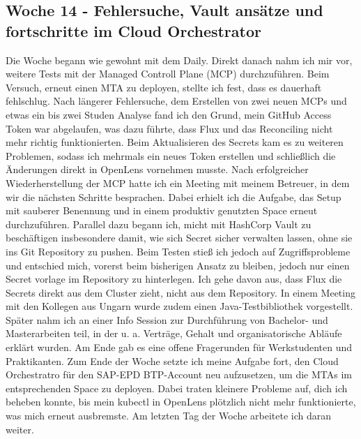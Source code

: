 \subsection{Woche 14 - Fehlersuche, Vault ansätze und fortschritte im Cloud Orchestrator}
Die Woche begann wie gewohnt mit dem Daily.
Direkt danach nahm ich mir vor, weitere Tests mit der Managed Controll Plane (MCP) durchzuführen.
Beim Versuch, erneut einen MTA zu deployen, stellte ich fest, dass es dauerhaft fehlschlug.
Nach längerer Fehlersuche, dem Erstellen von zwei neuen MCPs und etwas ein bis zwei Studen Analyse fand ich den Grund, mein
GitHub Access Token war abgelaufen, was dazu führte, dass Flux und das Reconciling nicht mehr richtig funktionierten.
Beim Aktualisieren des Secrets kam es zu weiteren Problemen, sodass ich mehrmals ein neues Token erstellen und schließlich die
Änderungen direkt in OpenLens vornehmen musste.
Nach erfolgreicher Wiederherstellung der MCP hatte ich ein Meeting mit meinem Betreuer, in dem wir die nächsten Schritte
besprachen.
Dabei erhielt ich die Aufgabe, das Setup mit sauberer Benennung und in einem produktiv genutzten Space erneut durchzuführen.
Parallel dazu begann ich, micht mit HashCorp Vault zu beschäftigen insbesondere damit, wie sich Secret sicher verwalten lassen,
ohne sie ins Git Repository zu pushen.
Beim Testen stieß ich jedoch auf Zugriffsprobleme und entschied mich, vorerst beim bisherigen Ansatz zu bleiben, jedoch
nur einen Secret vorlage im Repository zu hinterlegen.
Ich gehe davon aus, dass Flux die Secrets direkt aus dem Cluster zieht, nicht aus dem Repository.
In einem Meeting mit den Kollegen aus Ungarn wurde zudem einen Java-Testbibliothek vorgestellt.
Später nahm ich an einer Info Session zur Durchführung von Bachelor- und Masterarbeiten teil, in der u. a. Verträge, Gehalt
und organisatorische Abläufe erklärt wurden.
Am Ende gab es eine offene Fragerunden für Werkstudenten und Praktikanten.
Zum Ende der Woche setzte ich meine Aufgabe fort, den Cloud Orchestratro für den SAP-EPD BTP-Account neu aufzusetzen, um die
MTAs im entsprechenden Space zu deployen.
Dabei traten kleinere Probleme auf, dich ich beheben konnte, bis mein kubectl in OpenLens plötzlich nicht mehr funktionierte,
was mich erneut ausbremste.
Am letzten Tag der Woche arbeitete ich daran weiter.

